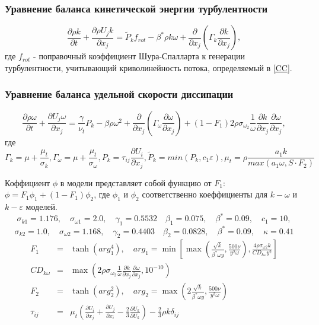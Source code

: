 		\subsubsection{Уравнение баланса кинетической энергии турбулентности}
				\begin{equation}
				\frac{\partial \rho k}{\partial t} + \frac{\partial \rho U_j k}{\partial x_j} = \tilde{P}_k f_{rot} - \beta^* \rho k \omega + \frac{\partial}{\partial x_j}(\Gamma_k \frac{\partial k}{\partial x_j}),
				\end{equation}
				где $f_{rot}$ - поправочный коэффициент Шура-Спалларта к генерации турбулентности, учитывающий криволинейность потока, определяемый в \ref{CC}.
		\subsubsection{Уравнение баланса удельной скорости диссипации}
			\begin{equation}
				\frac{\partial \rho \omega}{\partial t} + \frac{\partial U_j \omega}{\partial x_j} = \frac{\gamma}{\nu_t}P_k - \beta\rho\omega^2 + \frac{\partial}{\partial x_j}(\Gamma_{\omega}\frac{\partial \omega}{\partial x_j}) + (1-F_1)2\rho \sigma_{\omega_2}\frac{1}{\omega}\frac{\partial k}{\partial x_j}\frac{\partial \omega}{\partial x_j},
			\end{equation}
			где
			\small{
			\begin{equation}
				\Gamma_k = \mu + \frac{\mu_t}{\sigma_k}, \Gamma_{\omega} = \mu + \frac{\mu_t}{\sigma_{\omega}}, P_k = \tau_{ij}\frac{\partial U_i}{\partial x_j}, \tilde{P}_k = min(P_k, c_1\varepsilon), \mu_t=\rho\frac{a_1 k}{max(a_1\omega, S \cdot F_2)}
			\end{equation}
			}
			
			Коффициент $\phi$ в модели представляет собой функцию от $F_1$: $\phi = F_1\phi_1 + (1-F_1)\phi_2$, где $\phi_1$ и $\phi_2$ соответственно коеффициенты для $k-\omega$ и $k-\varepsilon$ моделей.
			$$
				\sigma_{k1} = 1.176, \quad \sigma_{\omega 1} = 2.0, \quad \gamma_1 = 0.5532 \quad \beta_1=0.075, \quad \beta^*=0.09, \quad c_1 = 10,
			$$
			$$
				\sigma_{k2} = 1.0, \quad \sigma_{\omega 2} = 1.168, \quad \gamma_2 = 0.4403 \quad \beta_2=0.0828, \quad \beta^*=0.09, \quad \kappa = 0.41
			$$
			\begin{eqnarray}
				F_1 &=& \tanh{(arg_1^4)}, \quad arg_1 = \min\left[\max\left(\frac{\sqrt{k}}{\beta^*\omega y},\frac{500 \nu}{y^2 \omega} \right), \frac{4\rho\sigma_{\omega 2}k}{CD_{k\omega}y^2}\right] \\ \nonumber CD_{k\omega} &=& \max\left( 2\rho\sigma_{\omega_2}\frac{1}{\omega}\frac{\partial k}{\partial x_j}\frac{\partial \omega}{\partial x_j},10^{-10} \right) \\
				F_2 &=& \tanh{(arg_2^2)}, \quad arg_2 = \max\left(2\frac{\sqrt{k}}{\beta^*\omega y},\frac{500 \nu}{y^2\omega}\right) \\
				\nonumber \tau_{ij} &=& \mu_t\left( \frac{\partial U_i}{\partial x_j} + \frac{\partial U_j}{\partial x_i} - \frac{2}{3}\frac{\partial U_k}{\partial U_k}\right) - \frac{2}{3}\rho k \delta_{ij}
			\end{eqnarray}
			\newpage
